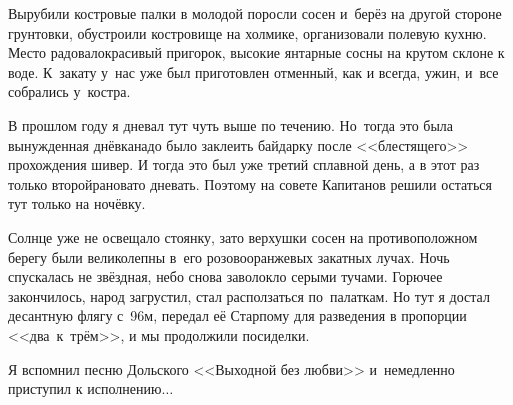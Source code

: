 Вырубили костровые палки в молодой поросли сосен и~берёз на другой стороне грунтовки, обустроили костровище на холмике, организовали полевую кухню. Место радовало\mdash красивый пригорок, высокие янтарные сосны на крутом склоне к воде. К~закату у~нас уже был приготовлен отменный, как и всегда, ужин, и~все собрались у~костра. 

В прошлом году я дневал тут чуть выше по течению. Но~тогда это была вынужденная днёвка\mdash  надо было заклеить байдарку после <<блестящего>> прохождения шивер. И тогда это был уже третий сплавной день, а в этот раз только второй\mdash рановато дневать. Поэтому на совете Капитанов решили остаться тут только на ночёвку.

Солнце уже не освещало стоянку, зато верхушки сосен на противоположном берегу были великолепны в~его розово\sdash оранжевых закатных лучах. Ночь спускалась не звёздная, небо снова заволокло серыми тучами. Горючее закончилось, народ загрустил, стал расползаться по~палаткам. Но тут я достал десантную флягу с~96\sdash м, передал её Старпому для разведения в пропорции <<два~к~трём>>, и мы продолжили посиделки. 

Я вспомнил песню Дольского <<Выходной без любви>> и~немедленно приступил к исполнению$\ldots$  

